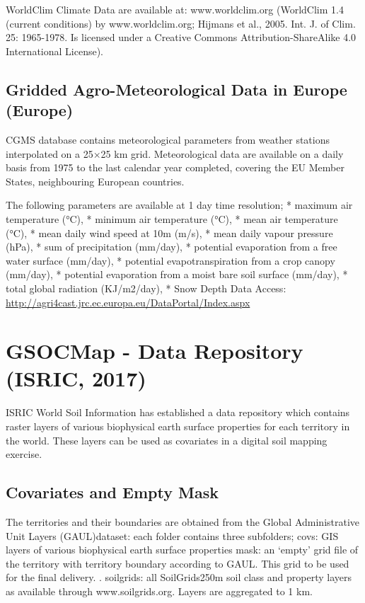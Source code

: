 \documentclass[]{book}
\theoremstyle{definition}
\theoremstyle{definition}
\theoremstyle{definition}
\theoremstyle{remark}
\begin{document}
WorldClim Climate Data are available at: www.worldclim.org (WorldClim
1.4 (current conditions) by www.worldclim.org; Hijmans et al., 2005.
Int. J. of Clim. 25: 1965-1978. Is licensed under a Creative Commons
Attribution-ShareAlike 4.0 International License).

\subsection{Gridded Agro-Meteorological Data in Europe
(Europe)}\label{gridded-agro-meteorological-data-in-europe-europe}

CGMS database contains meteorological parameters from weather stations
interpolated on a 25×25 km grid. Meteorological data are available on a
daily basis from 1975 to the last calendar year completed, covering the
EU Member States, neighbouring European countries.

The following parameters are available at 1 day time resolution; *
maximum air temperature (°C), * minimum air temperature (°C), * mean air
temperature (°C), * mean daily wind speed at 10m (m/s), * mean daily
vapour pressure (hPa), * sum of precipitation (mm/day), * potential
evaporation from a free water surface (mm/day), * potential
evapotranspiration from a crop canopy (mm/day), * potential evaporation
from a moist bare soil surface (mm/day), * total global radiation
(KJ/m2/day), * Snow Depth Data Access:
\url{http://agri4cast.jrc.ec.europa.eu/DataPortal/Index.aspx}

\section{GSOCMap - Data Repository (ISRIC,
2017)}\label{gsocmap---data-repository-isric-2017}

ISRIC World Soil Information has established a data repository which
contains raster layers of various biophysical earth surface properties
for each territory in the world. These layers can be used as covariates
in a digital soil mapping exercise.

\subsection{Covariates and Empty Mask}\label{covariates-and-empty-mask}

The territories and their boundaries are obtained from the Global
Administrative Unit Layers (GAUL)dataset: each folder contains three
subfolders; covs: GIS layers of various biophysical earth surface
properties mask: an `empty' grid file of the territory with territory
boundary according to GAUL. This grid to be used for the final delivery.
. soilgrids: all SoilGrids250m soil class and property layers as
available through www.soilgrids.org. Layers are aggregated to 1 km.
\end{document}
